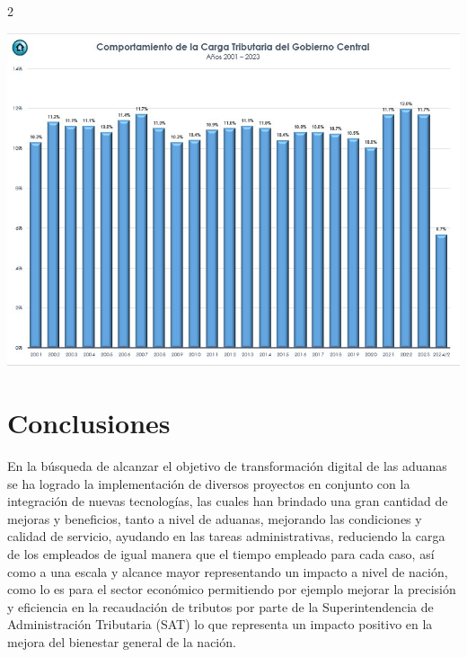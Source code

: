 \documentclass[12pt,spanish,Letterpaper,openany]{book}
\begin{document}
\begin {multicols}{2}
\bigskip
\bigskip

\begin {flushleft}
\noindent\begin{minipage}[c]{\columnwidth}

\begin{center}\includegraphics[width=1\linewidth]{imagenes_articulos/sp16_02} \end{center}

\end{minipage}
\end {flushleft}

\bigskip
\bigskip
\bigskip
\bigskip
\bigskip
\bigskip
\bigskip
\bigskip

\hypertarget{conclusiones-10}{%
\section{Conclusiones}\label{conclusiones-10}}

En la búsqueda de alcanzar el objetivo de transformación digital de las aduanas se ha logrado la implementación de diversos proyectos en conjunto con la integración de nuevas tecnologías, las cuales han brindado una gran cantidad de mejoras y beneficios, tanto a nivel de aduanas, mejorando las condiciones y calidad de servicio, ayudando en las tareas administrativas, reduciendo la carga de los empleados de igual manera que el tiempo empleado para cada caso, así como a una escala y alcance mayor representando un impacto a nivel de nación, como lo es para el sector económico permitiendo por ejemplo mejorar la precisión y eficiencia en la recaudación de tributos por parte de la Superintendencia de Administración Tributaria (SAT) lo que representa un impacto positivo en la mejora del bienestar general de la nación.


\end{multicols}
\end{document}
